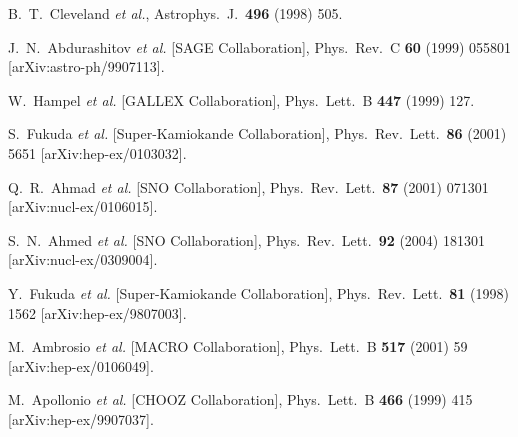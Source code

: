 \documentclass[12pt]{elsart}
\begin{document}
\begin{thebibliography}{99}

  B.~T.~Cleveland {\it et al.},
  Astrophys.\ J.\  {\bf 496} (1998) 505.

  J.~N.~Abdurashitov {\it et al.}  [SAGE Collaboration],
  Phys.\ Rev.\  C {\bf 60} (1999) 055801
  [arXiv:astro-ph/9907113].

  W.~Hampel {\it et al.}  [GALLEX Collaboration],
  Phys.\ Lett.\  B {\bf 447} (1999) 127.

  S.~Fukuda {\it et al.}  [Super-Kamiokande Collaboration],
  Phys.\ Rev.\ Lett.\  {\bf 86} (2001) 5651
  [arXiv:hep-ex/0103032].

  Q.~R.~Ahmad {\it et al.}  [SNO Collaboration],
  Phys.\ Rev.\ Lett.\  {\bf 87} (2001) 071301
  [arXiv:nucl-ex/0106015].

  S.~N.~Ahmed {\it et al.}  [SNO Collaboration],
  Phys.\ Rev.\ Lett.\  {\bf 92} (2004) 181301
  [arXiv:nucl-ex/0309004].

  Y.~Fukuda {\it et al.}  [Super-Kamiokande Collaboration],
  Phys.\ Rev.\ Lett.\  {\bf 81} (1998) 1562
  [arXiv:hep-ex/9807003].

  M.~Ambrosio {\it et al.}  [MACRO Collaboration],
  Phys.\ Lett.\  B {\bf 517} (2001) 59
  [arXiv:hep-ex/0106049].
  
  M.~Apollonio {\it et al.}  [CHOOZ Collaboration],
  Phys.\ Lett.\  B {\bf 466} (1999) 415
  [arXiv:hep-ex/9907037].


\end{thebibliography}
\end{document}
